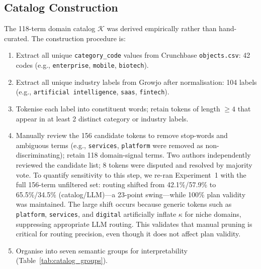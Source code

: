 \documentclass[preprint,12pt]{elsarticle}
\newcommand{\calK}{\mathcal{K}}
\begin{document}
\subsection{Catalog Construction}
\label{sec:method_catalog}

The 118-term domain catalog $\calK$ was derived empirically rather than
hand-curated. The construction procedure is:

\begin{enumerate}[label=(\arabic*)]
  \item Extract all unique \texttt{category\_code} values from Crunchbase
        \texttt{objects.csv}: 42 codes (e.g., \texttt{enterprise}, \texttt{mobile},
        \texttt{biotech}).
  \item Extract all unique industry labels from Growjo after normalisation:
        104 labels (e.g., \texttt{artificial intelligence}, \texttt{saas},
        \texttt{fintech}).
  \item Tokenise each label into constituent words; retain tokens of length
        $\ge 4$ that appear in at least 2 distinct category or industry labels.
  \item Manually review the 156 candidate tokens to remove stop-words and
        ambiguous terms (e.g., \texttt{services}, \texttt{platform} were removed
        as non-discriminating); retain 118 domain-signal terms. Two authors
        independently reviewed the candidate list; 8 tokens were disputed and
        resolved by majority vote. To quantify sensitivity to this step, we
        re-ran Experiment~1 with the full 156-term unfiltered set: routing
        shifted from 42.1\%/57.9\% to 65.5\%/34.5\% (catalog/LLM)---a
        23-point swing---while 100\% plan validity was maintained. The large
        shift occurs because generic tokens such as \texttt{platform},
        \texttt{services}, and \texttt{digital} artificially inflate $\kappa$
        for niche domains, suppressing appropriate LLM routing. This validates
        that manual pruning is critical for routing precision, even though it
        does not affect plan validity.
  \item Organise into seven semantic groups for interpretability
        (Table~\ref{tab:catalog_groups}).
\end{enumerate}
\end{document}
